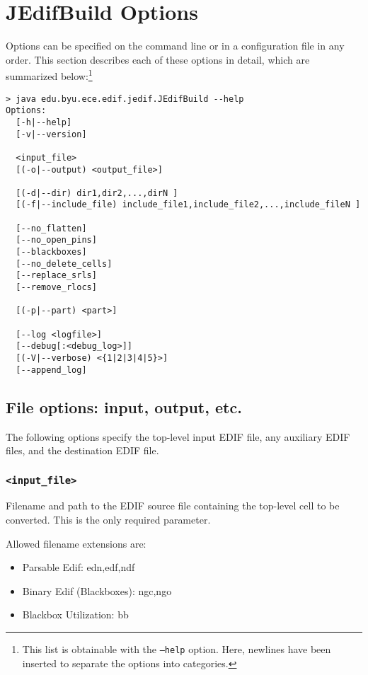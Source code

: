 \section{JEdifBuild Options}
Options can be specified on the command line or in a configuration file in any 
order. This section describes each of these options in detail, which are 
summarized below:\footnote{This list is obtainable with the \texttt{--help} 
option. Here, newlines have been inserted to separate the options into 
categories.}

\begin{verbatim}
> java edu.byu.ece.edif.jedif.JEdifBuild --help
Options:
  [-h|--help]
  [-v|--version]

  <input_file>
  [(-o|--output) <output_file>]

  [(-d|--dir) dir1,dir2,...,dirN ]
  [(-f|--include_file) include_file1,include_file2,...,include_fileN ]

  [--no_flatten]
  [--no_open_pins]
  [--blackboxes]
  [--no_delete_cells]
  [--replace_srls]
  [--remove_rlocs]

  [(-p|--part) <part>]

  [--log <logfile>]
  [--debug[:<debug_log>]]
  [(-V|--verbose) <{1|2|3|4|5}>]
  [--append_log]

\end{verbatim}

\subsection{File options: input, output, etc.}
The following options specify the top-level input EDIF file, any auxiliary EDIF
files, and the destination EDIF file.

\subsubsection{\texttt{<input\_file>}}
Filename and path to the EDIF source file containing the top-level cell to be 
converted. This is the only required parameter.

Allowed filename extensions are:
\begin{itemize}
  \item Parsable Edif: edn,edf,ndf
  \item Binary Edif (Blackboxes): ngc,ngo
  \item Blackbox Utilization: bb
\end{itemize}

